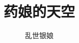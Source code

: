 \documentclass[preprint,12pt]{elsarticle}
\numberwithin{equation}{section}
\begin{document}
\tableofcontents
	\begin{frontmatter}
		\title{药娘的天空}
		\author[label1]{乱世银娘}
	\address[label1]{https://www.weibo.com/p/1005055513855401} 
\end{frontmatter}





\end{document}
